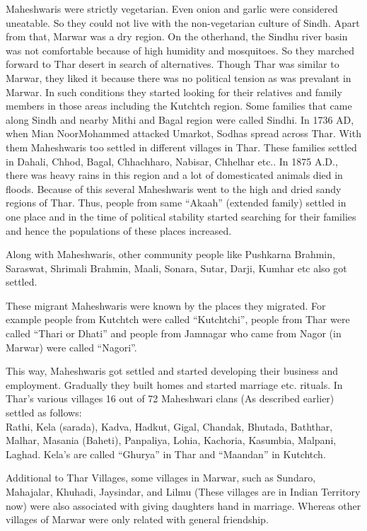 Maheshwaris were strictly vegetarian. Even onion and garlic were considered uneatable. So they could not live with the non-vegetarian culture of Sindh. Apart from that, Marwar was a dry region. On the otherhand, the Sindhu river basin was not comfortable because of high humidity and mosquitoes. So they marched forward to Thar desert in search of alternatives. Though Thar was similar to Marwar, they liked it because there was no political tension as was prevalant in Marwar. In such conditions they started looking for their relatives and family members in those areas including the Kutchtch region. Some families that came along Sindh and nearby Mithi and Bagal region were called Sindhi. In 1736 AD, when Mian NoorMohammed attacked Umarkot, Sodhas spread across Thar. With them Maheshwaris too settled in different villages in Thar. These families settled in Dahali, Chhod, Bagal, Chhachharo, Nabisar, Chhelhar etc.. In 1875 A.D., there was heavy rains in this region and a lot of domesticated animals died in floods. Because of this several Maheshwaris went to the high and dried sandy regions of Thar. Thus, people from same ``Akaah'' (extended family) settled in one place and in the time of political stability started searching for their families and hence the populations of these places increased.

Along with Maheshwaris, other community people like Pushkarna Brahmin, Saraswat, Shrimali Brahmin, Maali, Sonara, Sutar, Darji, Kumhar etc also got settled.

These migrant Maheshwaris were known by the places they migrated. For example people from Kutchtch were called ``Kutchtchi'', people from Thar were called ``Thari or Dhati'' and people from Jamnagar who came from Nagor (in Marwar) were called ``Nagori''.

This way, Maheshwaris got settled and started developing their business and employment. Gradually they built homes and started marriage etc. rituals. In Thar's various villages 16 out of 72 Maheshwari clans (As described earlier) settled as follows:\\
Rathi, Kela (sarada), Kadva, Hadkut, Gigal, Chandak, Bhutada, Baththar, Malhar, Masania (Baheti), Panpaliya, Lohia, Kachoria, Kasumbia, Malpani, Laghad. Kela's are called ``Ghurya'' in Thar and ``Maandan'' in Kutchtch.

Additional to Thar Villages, some villages in Marwar, such as Sundaro, Mahajalar, Khuhadi, Jaysindar, and Lilmu (These villages are in Indian Territory now) were also associated with giving daughters hand in marriage. Whereas other villages of Marwar were only related with general friendship.
